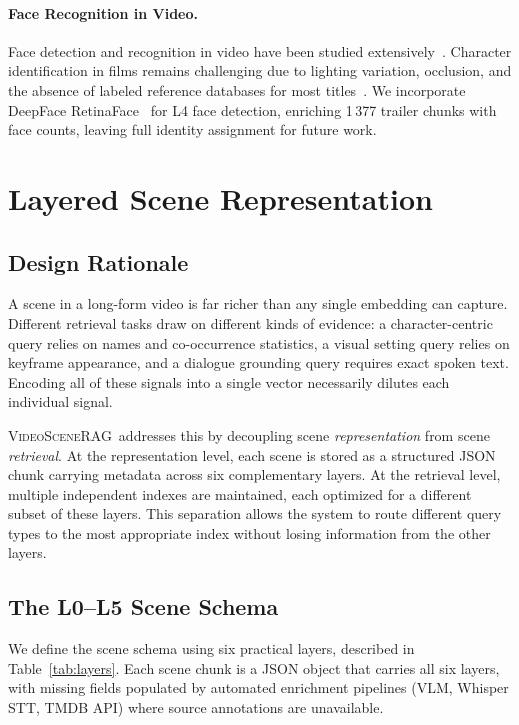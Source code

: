 \documentclass[11pt]{article}
\newcommand{\system}{\textsc{VideoSceneRAG}}
\begin{document}
\paragraph{Face Recognition in Video.}
Face detection and recognition in video have been studied
extensively~\cite{deepface,retinaface}.  Character identification in films
remains challenging due to lighting variation, occlusion, and the absence of
labeled reference databases for most titles~\cite{movienet}.  We incorporate
DeepFace RetinaFace~\cite{retinaface} for L4 face detection, enriching
1\,377 trailer chunks with face counts, leaving full identity assignment for
future work.

\section{Layered Scene Representation}
\label{sec:schema}

\subsection{Design Rationale}

A scene in a long-form video is far richer than any single embedding can
capture.  Different retrieval tasks draw on different kinds of evidence: a
character-centric query relies on names and co-occurrence statistics, a visual
setting query relies on keyframe appearance, and a dialogue grounding query
requires exact spoken text.  Encoding all of these signals into a single
vector necessarily dilutes each individual signal.

\system\ addresses this by decoupling scene \emph{representation} from scene
\emph{retrieval}.  At the representation level, each scene is stored as a
structured JSON chunk carrying metadata across six complementary layers.  At
the retrieval level, multiple independent indexes are maintained, each
optimized for a different subset of these layers.  This separation allows the
system to route different query types to the most appropriate index without
losing information from the other layers.

\subsection{The L0--L5 Scene Schema}

We define the scene schema using six practical layers, described in
Table~\ref{tab:layers}.  Each scene chunk is a JSON object that carries all
six layers, with missing fields populated by automated enrichment pipelines
(VLM, Whisper STT, TMDB API) where source annotations are unavailable.
\end{document}
